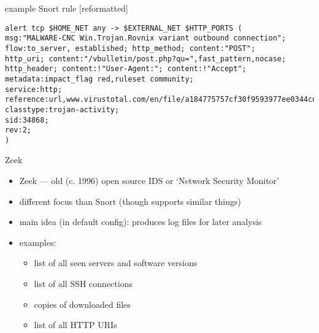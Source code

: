 \begin{frame}[fragile]{example Snort rule [reformatted]}
\begin{Verbatim}[fontsize=\small]
alert tcp $HOME_NET any -> $EXTERNAL_NET $HTTP_PORTS (
msg:"MALWARE-CNC Win.Trojan.Rovnix variant outbound connection";
flow:to_server, established; http_method; content:"POST";
http_uri; content:"/vbulletin/post.php?qu=",fast_pattern,nocase;
http_header; content:!"User-Agent:"; content:!"Accept";
metadata:impact_flag red,ruleset community;
service:http;
reference:url,www.virustotal.com/en/file/a184775757cf30f9593977ee0344cd6c54deb4b14a012a7af8e3a2cdbb85a749/analysis/;
classtype:trojan-activity;
sid:34868;
rev:2;
)
\end{Verbatim}
\end{frame}

\begin{frame}[fragile]{Zeek}
    \begin{itemize}
    \item Zeek --- old (c. 1996) open source IDS or `Network Security Monitor'
    \item different focus than Snort (though supports similar things)
    \vspace{.5cm}
    \item main idea (in default config): produces log files for later analysis
    \item examples:
        \begin{itemize}
        \item list of all seen servers and software versions
        \item list of all SSH connections
        \item copies of downloaded files
        \item list of all HTTP URIs
        \end{itemize}
    \end{itemize}
\end{frame}

